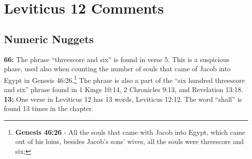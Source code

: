 \section{Leviticus 12 Comments}

\subsection{Numeric Nuggets}
\textbf{66: } The phrase ``threescore and six'' is found in verse 5.  This is a suspicious phase, used also when counting the number of souls that came of Jacob into Egypt in Genesis 46:26.\footnote{\textbf{Genesis 46:26} -  All the souls that came with Jacob into Egypt, which came out of his loins, besides Jacob’s sons’ wives, all the souls were threescore and six;} The phrase is also a part of the ``six hundred threescore and six'' phrase found in 1 Kings 10:14, 2 Chronicles 9:13, and Revelation 13:18.\\
\noindent \textbf{13: } One verse in Leviticus 12 has 13 words, Leviticus 12:12. The word ``shall'' is found 13 times in the chapter.


